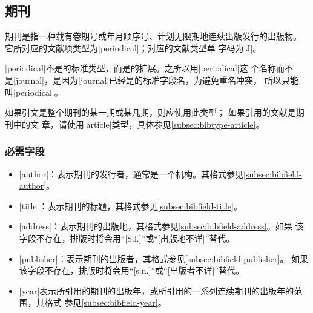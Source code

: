 
\subsection{期刊}\label{subsec:bibtype-periodical}

期刊是指一种载有卷期号或年月顺序号、计划无限期地连续出版发行的出版物\cite{gbt7714-2005}。
它所对应的{\BibTeX}文献项类型为|periodical|；对应的文献类型单
字码为|J|\cite{gbt3469-1983}。

|periodical|不是{\BibTeX}的标准类型，而是{\njuthesis}的扩展。之所以用|periodical|这
个名称而不是|journal|，是因为|journal|已经是{\BibTeX}的标准字段名，为避免重名冲突，
所以只能叫|periodical|。

\begin{note}
如果引文是整个期刊的某一期或某几期，则应使用此类型； 如果引用的文献是期刊中的文
章，请使用|article|类型，具体参见\ref{subsec:bibtype-article}。
\end{note}

\subsubsection{必需字段}

\begin{itemize}
\item |author|：表示期刊的发行者，通常是一个机构。其格式参见\ref{subsec:bibfield-author}。
\item |title|：表示期刊的标题，其格式参见\ref{subsec:bibfield-title}。
\item |address|：表示期刊的出版地，其格式参见\ref{subsec:bibfield-address}。如果
  该字段不存在，{\BibTeX}排版时将会用``[S.l.]''或``[出版地不详]''替代。
\item |publisher|：表示期刊的出版者，其格式参见\ref{subsec:bibfield-publisher}。
  如果该字段不存在，{\BibTeX}排版时将会用``[s.n.]''或``[出版者不详]''替代。
\item |year|表示所引用的期刊的出版年，或所引用的一系列连续期刊的出版年的范围，其格式
  参见\ref{subsec:bibfield-year}。
\end{itemize}


